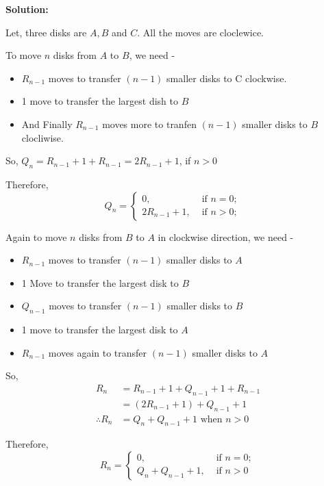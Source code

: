 \begin{flushleft}
\textbf{Solution:}
\par
Let, three disks are $A, B$ and $C$. All the moves are cloclewice.

To move $n$ disks from $A$ to $B$, we need -
\begin{itemize}
    \item $R_{n-1}$ moves to transfer $(n-1)$ smaller disks to C clockwise.
    \item  1 move to transfer the largest dish to $B$
    \item And Finally $R_{n-1}$ moves more to tranfen $(n-1)$ smaller disks to $B$ clocliwise.
\end{itemize}
So, $Q_n=R_{n-1}+1+R_{n-1}=2 R_{n-1}+1$, if $n>0$
\par
Therefore, 
$$
Q_n=\left\{\begin{array}{ll}
0, & \text { if } n=0 ; \\
2 R_{n-1}+1, & \text { if } n>0 ;
\end{array} \quad 
\right.
$$


Again to move $n$ disks from $B$ to $A$ in clockwise direction, we need -
\begin{itemize}
    \item  $R_{n-1}$ moves to transfer $(n-1)$ smaller disks to $A$
    \item 1 Move to transfer the largest disk to $B$
    \item $Q_{n-1}$ moves to transfer $(n-1)$ smaller disks to $B$
    \item 1 move to transfer the largest disk to $A$
    \item $R_{n-1}$ moves again to transfer $(n-1)$ smaller disks to $A$
\end{itemize}
So,
$$
\begin{aligned}
R_n & =R_{n-1}+1+Q_{n-1}+1+R_{n-1} \\
& =\left(2 R_{n-1}+1\right)+Q_{n-1}+1 \\
\therefore R_n & =Q_n+Q_{n-1}+1 \text { when } n>0
\end{aligned}
$$

Therefore,
$$
R_n=\left\{\begin{array}{ll}
0, & \text { if } n=0 ; \\
Q_n+Q_{n-1}+1, & \text { if } n>0
\end{array}\right.
$$

\end{flushleft}
